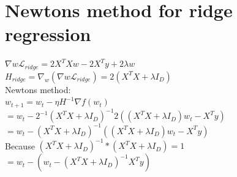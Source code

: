 \section{Newtons method for ridge regression}
$\nabla{w}\mathcal{L}_{ridge}=2X^{T}Xw-2X^{T}y+2\lambda w$\\ $H_{ridge}=\nabla_{w}
(\nabla{w}\mathcal{L}_{ridge})=2(X^{T}X+\lambda I_{D})$\\ Newtons method:\\
$w_{t+1}=w_{t}-\eta H^{-1}\nabla f(w_{t})$\\ $=w_{t}-2^{-1}(X^{T}X+\lambda I_{D})
^{-1}2((X^{T}X+\lambda I_{D})w_{t}-X^{T}y)$\\
$=w_{t}-(X^{T}X+\lambda I_{D})^{-1}((X^{T}X+\lambda I_{D})w_{t}-X^{T}y)$\\ Because
$(X^{T}X+\lambda I_{D})^{-1}*(X^{T}X+\lambda I_{D})=1$\\
$=w_{t}-(w_{t}-( X^{T}X+\lambda I_{D})^{-1}X^{T}y)$
